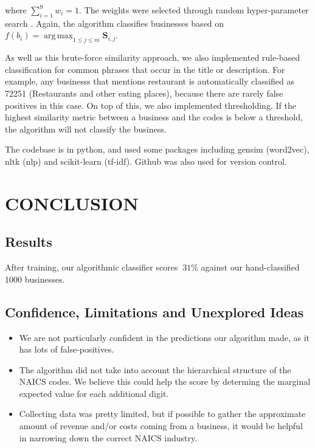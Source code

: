 \documentclass[letterpaper, 9 pt, conference]{IEEEtran}
\DeclareMathOperator*{\argmax}{arg\,max}
\newcommand{\matr}[1]{\mathbf{#1}}
\begin{document}
where $\sum_{i=1}^9 w_i=1$. The weights were selected through random hyper-parameter search \cite{random}. Again, the algorithm classifies businesses based on 
$f(b_i) = \argmax_{1 \leq j \leq m} \matr{S}_{i,j}.$

As well as this brute-force similarity approach, we also implemented rule-based classification for common phrases that occur in the title or description. For example, any businesss that mentions restaurant is automatically classified as 72251 (Restaurants and other eating places), because there are rarely false positives in this case. On top of this, we also implemented thresholding. If the highest similarity metric between a business and the codes is below a threshold, the algorithm will not classify the business.

The codebase is in python, and used some packages including gensim (word2vec), nltk (nlp) and scikit-learn (tf-idf). Github was also used for version control.

\section{CONCLUSION}

\subsection{Results}

After training, our algorithmic classifier scores $~31\%$ against our hand-classified 1000 businesses.

\subsection{Confidence, Limitations and Unexplored Ideas}

\begin{itemize}
\item We are not particularly confident in the predictions our algorithm made, as it has lots of false-positives.
\item The algorithm did not take into account the hierarchical structure of the NAICS codes. We believe this could help the score by determing the marginal expected value for each additional digit.
\item Collecting data was pretty limited, but if possible to gather the approximate amount of revenue and/or costs coming from a business, it would be helpful in narrowing down the correct NAICS industry.
\end{itemize}
\end{document}

